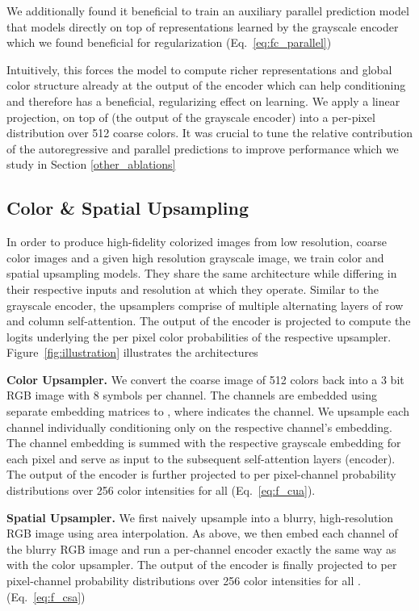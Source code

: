 \documentclass{article} \usepackage{iclr2021_conference,times}
\begin{document}
We additionally found it beneficial to train an auxiliary parallel prediction model that models  directly on top of representations learned by the grayscale encoder  which we found beneficial for regularization (Eq.~\ref{eq:fc_parallel})

Intuitively, this forces the model to compute richer representations and global color structure already at the output of the encoder which can help conditioning and therefore has a beneficial, regularizing effect on learning.
We apply a linear projection,  on top of  (the output of the grayscale encoder) into a per-pixel distribution over 512 coarse colors. It was crucial to tune the relative contribution of the autoregressive and parallel predictions to improve performance which we study in Section \ref{other_ablations}


\subsection{Color \& Spatial Upsampling}
\label{upsamplers}

In order to produce high-fidelity colorized images from low resolution, coarse color images and a given high resolution grayscale image, we train color and spatial upsampling models. They share the same architecture while differing in their respective inputs and resolution at which they operate. Similar to the grayscale encoder, the upsamplers comprise of multiple alternating layers of row and column self-attention. The output of the encoder is projected to compute the logits underlying the per pixel color probabilities of the respective upsampler. Figure~\ref{fig:illustration} illustrates the architectures

\textbf{Color Upsampler.}
We convert the coarse image  of 512 colors back into a 3 bit RGB image with 8 symbols per channel. The channels are embedded using separate embedding matrices to , where  indicates the channel. We upsample each channel individually conditioning only on the respective channel's embedding. The channel embedding is summed with the respective grayscale embedding for each pixel and serve as input to the subsequent self-attention layers (encoder). The output of the encoder is further projected to per pixel-channel probability distributions  over 256 color intensities for all  (Eq.~\ref{eq:f_cua}).

\textbf{Spatial Upsampler.} We first naively upsample  into a blurry, high-resolution RGB image using area interpolation. As above, we then embed each channel of the blurry RGB image and run a per-channel encoder exactly the same way as with the color upsampler. The output of the encoder is finally projected to per pixel-channel probability distributions  over 256 color intensities for all . (Eq.~\ref{eq:f_csa})
\end{document}
